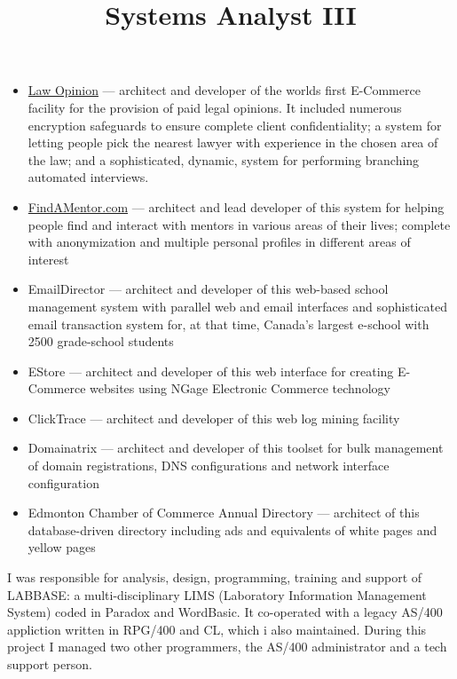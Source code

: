 \documentclass[line,margin]{res}
\begin{document}
\begin{resume}
\begin{position}
\begin{itemize}
\item \href{https://web.archive.org/web/19991205174419/http://www.lawopinion.com/}{Law Opinion}
   --- architect and developer of the worlds first E-Commerce facility for
       the provision of paid legal opinions.
       It included numerous encryption safeguards
       to ensure complete client confidentiality; a
       system for letting people pick the nearest
       lawyer with experience in the chosen area of
       the law;  and a sophisticated, dynamic,
       system for performing branching automated interviews.
\item \href{http://findamentor.com/}{FindAMentor.com}
   --- architect and lead developer of this system
       for helping people find and interact with mentors in
       various areas of their lives; complete with anonymization and
        multiple personal profiles in different areas of interest
\item EmailDirector
   --- architect and developer of this web-based school management
       system with parallel web and email interfaces
       and sophisticated email transaction system for,
       at that time, Canada's largest e-school
       with 2500 grade-school students
\item EStore
   --- architect and developer of this web interface for creating E-Commerce
       websites using NGage Electronic Commerce technology
\item ClickTrace --- architect and developer of this web log mining facility
\item Domainatrix --- architect and developer of this
                      toolset for bulk management of domain registrations,
                      DNS configurations and network interface
                      configuration
\item Edmonton Chamber of Commerce Annual Directory ---
         architect of this database-driven directory
         including ads and equivalents of white pages and yellow pages

\end{itemize}

\end{position}



\title{Systems Analyst III}
\begin{position}
  I was responsible for analysis, design, programming, training and support of LABBASE:
  a multi-disciplinary LIMS (Laboratory Information Management System)
  coded in Paradox and WordBasic.
  It co-operated with a legacy AS/400 appliction written in RPG/400 and CL,
  which i also maintained.
  During this project I managed two other programmers, the AS/400 administrator and a
  tech support person.
\end{position}



\end{resume}
\end{document}
